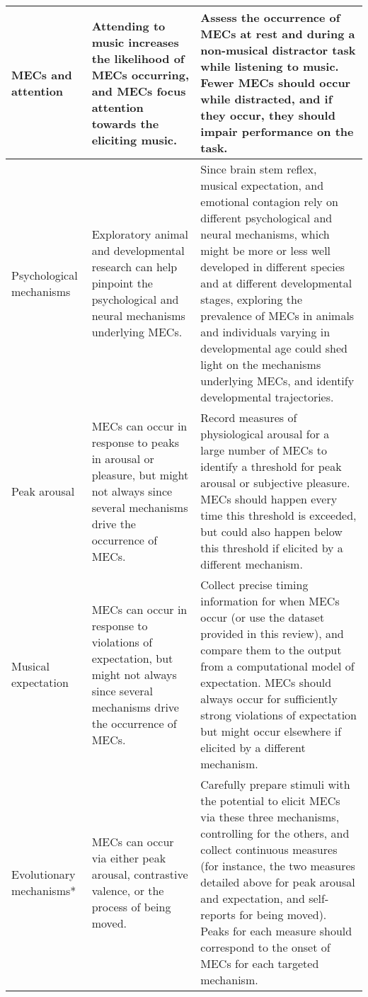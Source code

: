 \begin{table}[t!]
\begin{threeparttable}
\begin{tabular*}{\textwidth}{
    >{\raggedright}p{}
    >{\raggedright}p{}
    >{\raggedright\arraybackslash}p{}}
\hline
MECs and attention &
    Attending to music increases the likelihood of MECs occurring, and MECs focus attention towards the eliciting music. &
    Assess the occurrence of MECs at rest and during a non-musical distractor task while listening to music. Fewer MECs should occur while distracted, and if they occur, they should impair performance on the task. \\
    
\hline
Psychological mechanisms &
    Exploratory animal and developmental research can help pinpoint the psychological and neural mechanisms underlying MECs. &
    Since brain stem reflex, musical expectation, and emotional contagion rely on different psychological and neural mechanisms, which might be more or less well developed in different species and at different developmental stages, exploring the prevalence of MECs in animals and individuals varying in developmental age could shed light on the mechanisms underlying MECs, and identify developmental trajectories. \\
    
\hline
Peak arousal &
    MECs can occur in response to peaks in arousal or pleasure, but might not always since several mechanisms drive the occurrence of MECs. &
    Record measures of physiological arousal for a large number of MECs to identify a threshold for peak arousal or subjective pleasure. MECs should happen every time this threshold is exceeded, but could also happen below this threshold if elicited by a different mechanism. \\
    
\hline
Musical expectation &
    MECs can occur in response to violations of expectation, but might not always since several mechanisms drive the occurrence of MECs. &
    Collect precise timing information for when MECs occur (or use the dataset provided in this review), and compare them to the output from a computational model of expectation. MECs should always occur for sufficiently strong violations of expectation but might occur elsewhere if elicited by a different mechanism. \\

\hline    
Evolutionary mechanisms* &
    MECs can occur via either peak arousal, contrastive valence, or the process of being moved. &
    Carefully prepare stimuli with the potential to elicit MECs via these three mechanisms, controlling for the others, and collect continuous measures (for instance, the two measures detailed above for peak arousal and expectation, and self-reports for being moved). Peaks for each measure should correspond to the onset of MECs for each targeted mechanism. \\


\end{tabular*}
\end{threeparttable}
\end{table}
